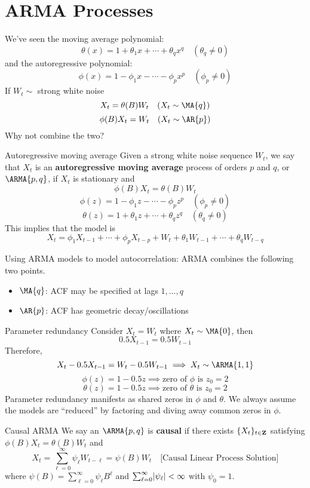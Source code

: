 \section{ARMA Processes}
We've seen the moving average polynomial:
\[ \theta(x)=1+\theta_1 x+\cdots+\theta_q x^q\quad(\theta_q\ne 0) \]
and the autoregressive polynomial:
\[ \phi(x)=1-\phi_1 x-\cdots - \phi_p x^p\quad(\phi_p\ne 0) \]
If $ W_t\sim $ strong white noise
\[ X_t=\theta(B)W_t\quad(X_t\sim \MA{q}) \]
\[ \phi(B)X_t=W_t\quad(X_t\sim\AR{p}) \]
Why not combine the two?
\begin{Definition}{Autoregressive moving average}{}
    Given a strong white noise sequence $ W_t $, we say
    that $ X_t $ is an \textbf{autoregressive moving average} process
    of orders $ p $ and $ q $, or $ \ARMA{p,q} $, if $ X_t $ is stationary
    and
    \[ \phi(B)X_t=\theta(B)W_t \]
    \[ \phi(z)=1-\phi_1 z-\cdots - \phi_p z^p\quad (\phi_p\ne 0) \]
    \[ \theta(z)=1+\theta_1 z+\cdots+\theta_q z^q \quad (\theta_q\ne 0) \]
    This implies that the model is
    \[ X_t=\phi_1X_{t-1}+\cdots+\phi_p X_{t-p}+
        W_t+\theta_1 W_{t-1}+\cdots+\theta_q W_{t-q} \]
\end{Definition}
Using ARMA models to model autocorrelation: ARMA combines the
following two points.
\begin{itemize}
    \item $ \MA{q} $: ACF may be specified at lags $ 1,\ldots,q $
    \item $ \AR{p} $: ACF has geometric decay/oscillations
\end{itemize}
\begin{Remark}{Parameter redundancy}{}
    Consider $ X_t=W_t $ where $ X_t\sim \MA{0} $, then
    \[ 0.5 X_{t-1}=0.5 W_{t-1} \]
    Therefore,
    \[ X_t-0.5 X_{t-1}=W_{t}-0.5W_{t-1}\implies X_t\sim \ARMA{1,1} \]
    \[ \phi(z)=1-0.5z\implies \text{zero of $\phi$ is }z_0=2 \]
    \[ \theta(z)=1-0.5z\implies \text{zero of $\theta$ is }z_0=2 \]
    Parameter redundancy manifests as shared zeros in $ \phi $
    and $ \theta $. We always assume the models are ``reduced''
    by factoring and diving away common zeros in $ \phi $.
\end{Remark}
\begin{Definition}{Causal ARMA}{}
    We say an $ \ARMA{p,q} $ is \textbf{causal} if there exists $ \{X_t\}_{t\in\mathbf{Z}} $
    satisfying $ \phi(B)X_t=\theta(B)W_{t}$ and
    \[ X_t=\sum_{\ell=0}^{\infty} \psi_\ell W_{t-\ell}=\psi(B)W_t \quad\text{[Causal Linear Process Solution]} \]
    where $ \psi(B)=\sum_{\ell=0}^{\infty} \psi_\ell B^\ell $
    and $ \sum_{\ell=0}^{\infty} \lvert\psi_\ell\rvert<\infty $ with
    $ \psi_0=1 $.
\end{Definition}
